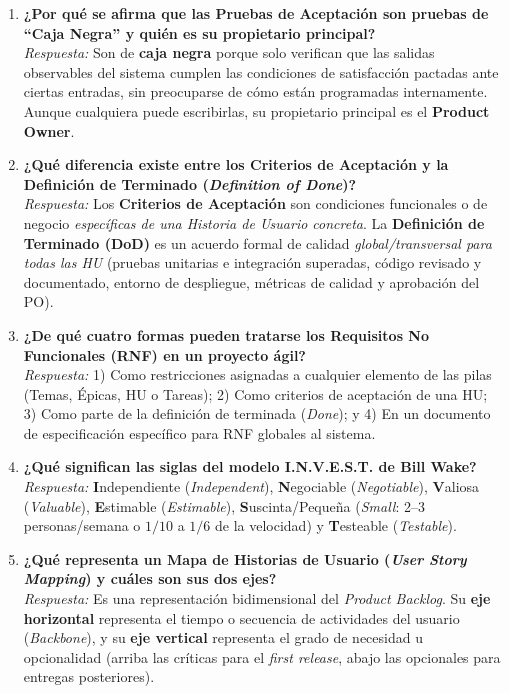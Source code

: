 \begin{enumerate}[label=\textbf{P\arabic*.}, itemsep=6pt]
    \item \textbf{¿Por qué se afirma que las Pruebas de Aceptación son pruebas de ``Caja Negra'' y quién es su propietario principal?}\\
    \textit{Respuesta:} Son de \textbf{caja negra} porque solo verifican que las salidas observables del sistema cumplen las condiciones de satisfacción pactadas ante ciertas entradas, sin preocuparse de cómo están programadas internamente. Aunque cualquiera puede escribirlas, su propietario principal es el \textbf{Product Owner}.

    \item \textbf{¿Qué diferencia existe entre los Criterios de Aceptación y la Definición de Terminado (\textit{Definition of Done})?}\\
    \textit{Respuesta:} Los \textbf{Criterios de Aceptación} son condiciones funcionales o de negocio \textit{específicas de una Historia de Usuario concreta}. La \textbf{Definición de Terminado (DoD)} es un acuerdo formal de calidad \textit{global/transversal para todas las HU} (pruebas unitarias e integración superadas, código revisado y documentado, entorno de despliegue, métricas de calidad y aprobación del PO).

    \item \textbf{¿De qué cuatro formas pueden tratarse los Requisitos No Funcionales (RNF) en un proyecto ágil?}\\
    \textit{Respuesta:} 1) Como restricciones asignadas a cualquier elemento de las pilas (Temas, Épicas, HU o Tareas); 2) Como criterios de aceptación de una HU; 3) Como parte de la definición de terminada (\textit{Done}); y 4) En un documento de especificación específico para RNF globales al sistema.

    \item \textbf{¿Qué significan las siglas del modelo I.N.V.E.S.T. de Bill Wake?}\\
    \textit{Respuesta:} \textbf{I}ndependiente (\textit{Independent}), \textbf{N}egociable (\textit{Negotiable}), \textbf{V}aliosa (\textit{Valuable}), \textbf{E}stimable (\textit{Estimable}), \textbf{S}uscinta/Pequeña (\textit{Small}: 2--3 personas/semana o $1/10$ a $1/6$ de la velocidad) y \textbf{T}esteable (\textit{Testable}).

    \item \textbf{¿Qué representa un Mapa de Historias de Usuario (\textit{User Story Mapping}) y cuáles son sus dos ejes?}\\
    \textit{Respuesta:} Es una representación bidimensional del \textit{Product Backlog}. Su \textbf{eje horizontal} representa el tiempo o secuencia de actividades del usuario (\textit{Backbone}), y su \textbf{eje vertical} representa el grado de necesidad u opcionalidad (arriba las críticas para el \textit{first release}, abajo las opcionales para entregas posteriores).


\end{enumerate}

